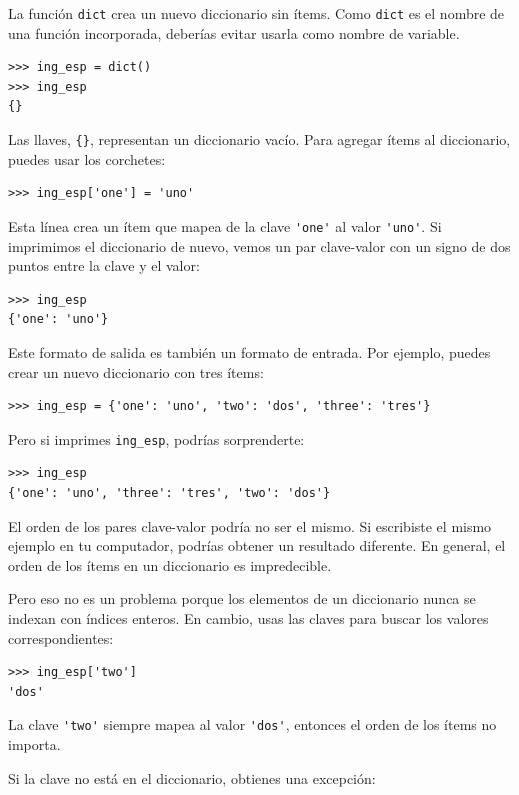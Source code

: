 \documentclass[10pt]{book}
\begin{document}
La función {\tt dict} crea un nuevo diccionario sin ítems.
Como {\tt dict} es el nombre de una función incorporada,
deberías evitar usarla como nombre de variable.

\begin{verbatim}
>>> ing_esp = dict()
>>> ing_esp
{}
\end{verbatim}

Las llaves, \verb"{}", representan un diccionario vacío.
Para agregar ítems al diccionario, puedes usar los corchetes:

\begin{verbatim}
>>> ing_esp['one'] = 'uno'
\end{verbatim}
%
Esta línea crea un ítem que mapea de la clave
\verb"'one'" al valor \verb"'uno'".  Si imprimimos el
diccionario de nuevo, vemos un par clave-valor con un signo de dos puntos
entre la clave y el valor:

\begin{verbatim}
>>> ing_esp
{'one': 'uno'}
\end{verbatim}
%
Este formato de salida es también un formato de entrada.  Por ejemplo,
puedes crear un nuevo diccionario con tres ítems:

\begin{verbatim}
>>> ing_esp = {'one': 'uno', 'two': 'dos', 'three': 'tres'}
\end{verbatim}
%
Pero si imprimes {\tt ing\_esp}, podrías sorprenderte:

\begin{verbatim}
>>> ing_esp
{'one': 'uno', 'three': 'tres', 'two': 'dos'}
\end{verbatim}
%
El orden de los pares clave-valor podría no ser el mismo.  Si
escribiste el mismo ejemplo en tu computador, podrías obtener un
resultado diferente.  En general, el orden de los ítems en
un diccionario es impredecible.

Pero eso no es un problema porque
los elementos de un diccionario nunca se indexan con índices enteros.
En cambio, usas las claves para buscar los valores correspondientes:

\begin{verbatim}
>>> ing_esp['two']
'dos'
\end{verbatim}
%
La clave \verb"'two'" siempre mapea al valor \verb"'dos'", entonces el orden
de los ítems no importa.

Si la clave no está en el diccionario, obtienes una excepción:
\end{document}
